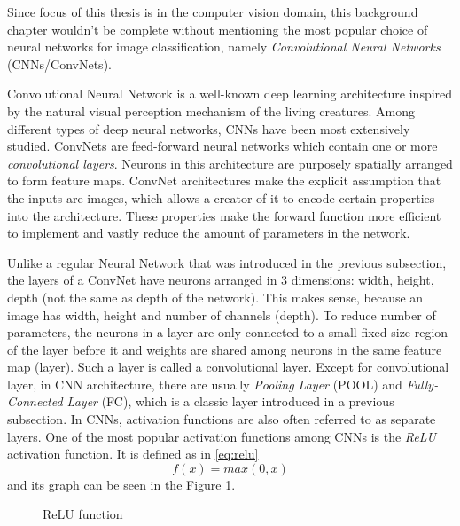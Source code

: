 Since focus of this thesis is in the computer vision domain, this background chapter wouldn't be complete without mentioning the most popular choice of neural networks for image classification, namely \textit{Convolutional Neural Networks} (CNNs/ConvNets).

Convolutional Neural Network is a well-known deep learning architecture inspired by the natural visual perception mechanism of the living creatures. Among different types of deep neural networks, CNNs have been most extensively studied. ConvNets are feed-forward neural networks which contain one or more \textit{convolutional layers}. Neurons in this architecture are purposely spatially arranged to form feature maps. ConvNet architectures make the explicit assumption that the inputs are images, which allows a creator of it to encode certain properties into the architecture. These properties make the forward function more efficient to implement and vastly reduce the amount of parameters in the network.

Unlike a regular Neural Network that was introduced in the previous subsection, the layers of a ConvNet have neurons arranged in 3 dimensions: width, height, depth (not the same as depth of the network). This makes sense, because an image has width, height and number of channels (depth). To reduce number of parameters, the neurons in a layer are only connected to a small fixed-size region of the layer before it and weights are shared among neurons in the same feature map (layer). Such a layer is called a convolutional layer. Except for convolutional layer, in CNN architecture, there are usually \textit{Pooling Layer} (POOL) and \textit{Fully-Connected Layer} (FC), which is a classic layer introduced in a previous subsection. In CNNs, activation functions are also often referred to as separate layers. One of the most popular activation functions among CNNs is the \textit{ReLU} activation function. It is defined as in  \ref{eq:relu}
\begin{equation}\label{eq:relu}
f(x) = max (0, x)
\end{equation}
and its graph can be seen in the Figure \ref{fig:relu}.

\begin{figure}[!ht]
\centering
{}
\caption{ReLU function}
\label{fig:relu}
\end{figure}

